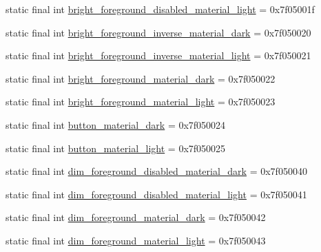 \begin{DoxyCompactItemize}
\item 
static final int \mbox{\hyperlink{classandroid_1_1support_1_1v7_1_1appcompat_1_1_r_1_1color_a33c7c2b4401cb8356a155a1afe362b47}{bright\+\_\+foreground\+\_\+disabled\+\_\+material\+\_\+light}} = 0x7f05001f
\item 
static final int \mbox{\hyperlink{classandroid_1_1support_1_1v7_1_1appcompat_1_1_r_1_1color_a1aa7ffb5447caf2b78c940133396d6d7}{bright\+\_\+foreground\+\_\+inverse\+\_\+material\+\_\+dark}} = 0x7f050020
\item 
static final int \mbox{\hyperlink{classandroid_1_1support_1_1v7_1_1appcompat_1_1_r_1_1color_ab4869d9734586f545a779eda36be9aea}{bright\+\_\+foreground\+\_\+inverse\+\_\+material\+\_\+light}} = 0x7f050021
\item 
static final int \mbox{\hyperlink{classandroid_1_1support_1_1v7_1_1appcompat_1_1_r_1_1color_a4597a12719cad1f96c80e5f687750001}{bright\+\_\+foreground\+\_\+material\+\_\+dark}} = 0x7f050022
\item 
static final int \mbox{\hyperlink{classandroid_1_1support_1_1v7_1_1appcompat_1_1_r_1_1color_ad034dc588b96d089b75eaa50a7c58b7b}{bright\+\_\+foreground\+\_\+material\+\_\+light}} = 0x7f050023
\item 
static final int \mbox{\hyperlink{classandroid_1_1support_1_1v7_1_1appcompat_1_1_r_1_1color_a5d1d5941ab6420731c5843ae63fe0789}{button\+\_\+material\+\_\+dark}} = 0x7f050024
\item 
static final int \mbox{\hyperlink{classandroid_1_1support_1_1v7_1_1appcompat_1_1_r_1_1color_a0f55ddca8d19bdc92c55d9e24598b13c}{button\+\_\+material\+\_\+light}} = 0x7f050025
\item 
static final int \mbox{\hyperlink{classandroid_1_1support_1_1v7_1_1appcompat_1_1_r_1_1color_a9ad8f0e9c7d60cc65f1e0be267909069}{dim\+\_\+foreground\+\_\+disabled\+\_\+material\+\_\+dark}} = 0x7f050040
\item 
static final int \mbox{\hyperlink{classandroid_1_1support_1_1v7_1_1appcompat_1_1_r_1_1color_a73560b92d6f0a6237771fa45d9043f04}{dim\+\_\+foreground\+\_\+disabled\+\_\+material\+\_\+light}} = 0x7f050041
\item 
static final int \mbox{\hyperlink{classandroid_1_1support_1_1v7_1_1appcompat_1_1_r_1_1color_a7c7a0aed93dcef9ce70bae142c8c1686}{dim\+\_\+foreground\+\_\+material\+\_\+dark}} = 0x7f050042
\item 
static final int \mbox{\hyperlink{classandroid_1_1support_1_1v7_1_1appcompat_1_1_r_1_1color_a12eb2c3fd6ba2ffd247cebc75ac00b5c}{dim\+\_\+foreground\+\_\+material\+\_\+light}} = 0x7f050043

\end{DoxyCompactItemize}
